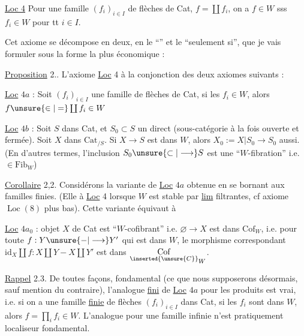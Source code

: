 \uline{Loc 4}  Pour une famille $(f_i)_{i\in I}$ de flèches de Cat,  $f=\coprod f_i$, on a $f\in W$ sss $f_i\in W$ pour tt $i\in I$.

Cet axiome se décompose en deux, en le ``'' et le ``seulement si'', que je vais  formuler sous la forme la plus économique :

\uline{Proposition} 2.. L'axiome \uline{Loc} 4   à la conjonction des deux axiomes suivants :



\uline{Loc} $4a$ : Soit $(f_i)_{i\in I}$ une famille de flèches de Cat, si les $f_i\in W$, alors $f\unsure{\in|=}\coprod f_i\in W$

\uline{Loc} $4b$ : Soit $S$ dans Cat, et $S_0\subset S$ un  direct (sous-catégorie à la fois ouverte et fermée). Soit $X$ dans $\mathrm{Cat}_{/S}$. Si $X\longrightarrow S$ est dans $W$, alors $X_0:=X\vert S_0\longrightarrow S_0$ aussi. (En d'autres termes, l'inclusion $S_0\unsure{\subset|\longrightarrow} S$ est une ``$W$-fibration'' i.e.  $\in\mathrm{Fib}_W$)

\uline{Corollaire} 2,2. Considérons la variante de \uline{Loc} $4a$ obtenue en se bornant aux familles finies. (Elle  à \uline{Loc} 4 lorsque $W$ est stable par \uline{lim} filtrantes, cf axiome $\operatorname{Loc}(8)$ plus bas). Cette variante équivaut à

\uline{Loc} $4a_0$ :  objet $X$ de Cat est ``$W$-cofibrant'' i.e. $\varnothing\longrightarrow X$ est dans $\mathrm{Cof}_W$, i.e. pour toute $f:Y\unsure{{-}|\longrightarrow}Y'$ qui est dans $W$, le morphisme correspondant $\mathrm{id}_X\amalg f:X\amalg Y{-}X\amalg Y'$ est dans $\underset{\inserted{\unsure{C}}}{\mathrm{Cof}}_W$.

\uline{Rappel} 2.3. De toutes façons,   fondamental (ce que nous supposerons désormais, sauf mention du contraire), l'analogue \uline{fini} de \uline{Loc} $4a$ pour les produits est vrai, i.e. si  on a une famille \uline{finie} de flèches $(f_i)_{i\in I}$ dans Cat, si les $f_i$ sont dans $W$, alors $f=\prod_i f_i\in W$. L'analogue pour une famille infinie n'est  pratiquement  localiseur fondamental.

